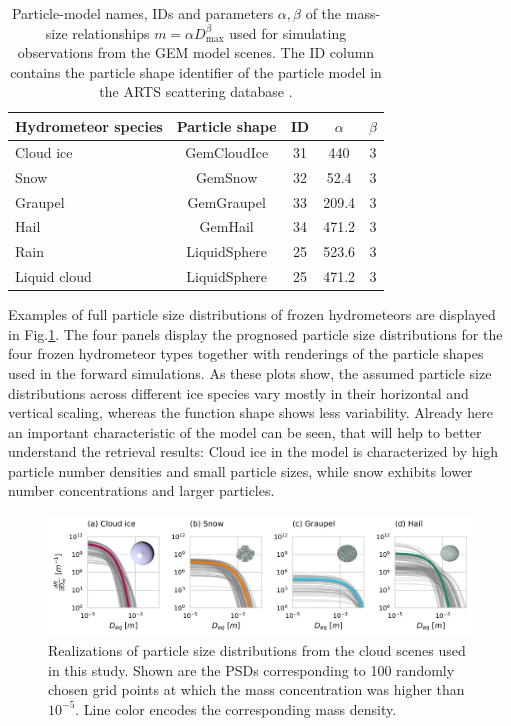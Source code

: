 \documentclass[journal abbreviation, manuscript]{copernicus}
\begin{document}
\begin{table}
  \centering
  \begin{tabular}{l|c|c|c|c}
    Hydrometeor species & Particle shape & ID & $\alpha$ & $\beta$ \\
    \hline
    Cloud ice    & GemCloudIce  & 31 & 440   & 3 \\
    Snow         & GemSnow      & 32 & 52.4  & 3 \\
    Graupel      & GemGraupel   & 33 & 209.4 & 3 \\
    Hail         & GemHail      & 34 & 471.2 & 3 \\
    Rain         & LiquidSphere & 25 & 523.6 & 3 \\
    Liquid cloud & LiquidSphere & 25 & 471.2 & 3 \\
  \end{tabular}
  \caption{Particle-model names, IDs and parameters $\alpha, \beta$ of the
    mass-size relationships $m = \alpha D_\text{max}^\beta$ used for simulating
    observations from the GEM model scenes. The ID column contains the particle
    shape identifier of the particle model in the ARTS scattering database
    \citep{eriksson18}.}
  \label{tab:species_parameters}
\end{table}

Examples of full particle size distributions of frozen hydrometeors are
displayed in Fig.\ref{fig:gem_psds}. The four panels display the prognosed
particle size distributions for the four frozen hydrometeor types together with
renderings of the particle shapes used in the forward simulations. As these
plots show, the assumed particle size distributions across different ice species
vary mostly in their horizontal and vertical scaling, whereas the function shape
shows less variability. Already here an important characteristic of the model
can be seen, that will help to better understand the retrieval results: Cloud
ice in the model is characterized by high particle number densities and small
particle sizes, while snow exhibits lower number concentrations and larger
particles.


\begin{figure}[h!]
\centering
\includegraphics[width = \textwidth]{../plots/gem_hydrometeors.png}
\caption{Realizations of particle size distributions from the cloud scenes used in
this study. Shown are the PSDs corresponding to 100 randomly chosen grid points at
which the mass concentration was higher than $10^{-5}$. Line color encodes the
corresponding mass density.}
\label{fig:gem_psds}
\end{figure}
\end{document}

